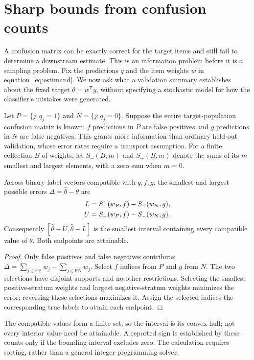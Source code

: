 \section{Sharp bounds from confusion counts}\label{sec:identification}
A confusion matrix can be exactly correct for the target items and still fail
to determine a downstream estimate. This is an information problem before it
is a sampling problem. Fix the predictions $q$ and the item weights $w$
in equation~\eqref{eq:estimand}. We now ask what a validation
summary establishes about the fixed target $\theta=w^{\mathsf T}y$, without
specifying a stochastic model for how the classifier's mistakes were generated.

Let $P=\{j:q_j=1\}$ and $N=\{j:q_j=0\}$. Suppose the entire target-population
confusion matrix is known: $f$ predictions in $P$ are false positives and $g$
predictions in $N$ are false negatives. This grants more information than ordinary
held-out validation, whose error rates require a transport assumption.
For a finite collection $B$ of weights, let $S_-(B,m)$ and $S_+(B,m)$ denote
the sums of its $m$ smallest and largest elements, with a zero sum when $m=0$.

\begin{proposition}\label{prop:bounds}
Across binary label vectors compatible with $q,f,g$, the smallest and largest
possible errors $\Delta=\widehat\theta-\theta$ are
\begin{align}
 L&=S_-(w_P,f)-S_+(w_N,g),\notag\\
 U&=S_+(w_P,f)-S_-(w_N,g).
\end{align}
Consequently $[\widehat\theta-U,\widehat\theta-L]$ is the smallest interval
containing every compatible value of $\theta$. Both endpoints are attainable.
\end{proposition}
\begin{proof}
Only false positives and false negatives contribute:
$\Delta=\sum_{j\in\mathrm{FP}}w_j-\sum_{j\in\mathrm{FN}}w_j$.
Select $f$ indices from $P$ and $g$ from $N$. The two selections have disjoint
supports and no other restrictions. Selecting the smallest positive-stratum
weights and largest negative-stratum weights minimizes the error; reversing
these selections maximizes it. Assign the selected indices the corresponding
true labels to attain each endpoint.
\end{proof}
The compatible values form a finite set, so the interval is its convex hull;
not every interior value need be attainable. A reported sign is established by
these counts only if the bounding interval excludes zero. The calculation
requires sorting, rather than a general integer-programming solver.


